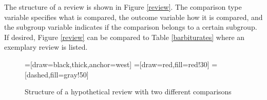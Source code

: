 \documentclass[11pt,a4paper,twoside]{book}\usepackage[]{graphicx}\usepackage[]{color}
\begin{document}
\begin{table}[ht]
\begin{center}
  \end{center}
\end{table}

The structure of a review is shown in Figure \ref{review}. 
The comparison type variable specifies what is compared, the outcome variable how it is compared, and the subgroup variable indicates if the comparison belongs to a certain subgroup. If desired, Figure \ref{review} can be compared to Table \ref{barbiturates} where an exemplary review is listed.

\begin{figure}
=[draw=black,thick,anchor=west]
=[draw=red,fill=red!30]
=[dashed,fill=gray!50]
\caption{Structure of a hypothetical review with two different comparisons\label{review.structure}}
\label{review.structure}
\end{figure}
\end{document}
